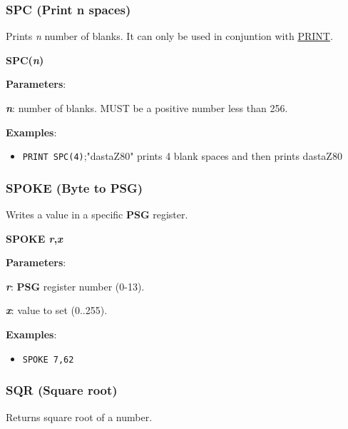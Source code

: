     \subsubsection{{SPC (Print n spaces)}}
    \label{msbasic:lang:spc}
    Prints \textit{n} number of blanks. It can only be used in conjuntion with
    \hyperref[msbasic:lang:print]{PRINT}.

    \hspace{1.9cm}\textbf{SPC(\textit{n})}

    \textbf{Parameters}:

    \hspace{1cm}\textbf{\textit{n}}: number of blanks. MUST be a positive number
    less than 256.

    \textbf{Examples}:
    \begin{itemize}
        \item \texttt{PRINT SPC(4)};"dastaZ80" prints 4 blank spaces and then
        prints dastaZ80
    \end{itemize}

    \subsubsection{{SPOKE (Byte to PSG)}}
    \label{msbasic:lang:spoke}
    Writes a value in a specific \textbf{PSG} register.

    \hspace{1.9cm}\textbf{SPOKE \textit{r},\textit{x}}

    \textbf{Parameters}:

    \hspace{1cm}\textbf{\textit{r}}: \textbf{PSG} register number (0-13).

    \hspace{1cm}\textbf{\textit{x}}: value to set (0..255).

    \textbf{Examples}:
    \begin{itemize}
        \item \texttt{SPOKE 7,62}
    \end{itemize}


    \subsubsection{{SQR (Square root)}}
    \label{msbasic:lang:sqr}
    Returns square root of a number.

